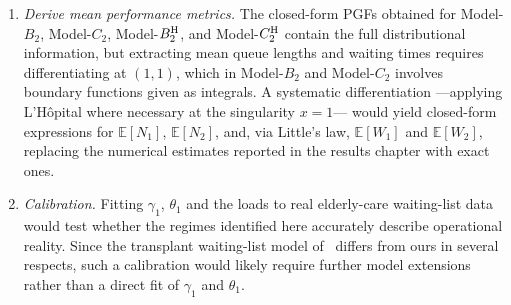 \begin{enumerate}
  \item \emph{Derive mean performance metrics.} The closed-form PGFs obtained for Model-$B_2$, Model-$C_2$, Model-$B_2^{\mathrm{H}}$, and Model-$C_2^{\mathrm{H}}$ contain the full distributional information, but extracting mean queue lengths and waiting times requires differentiating at $(1,1)$, which in Model-$B_2$ and Model-$C_2$ involves boundary functions given as integrals. A systematic differentiation ---applying L'H\^opital where necessary at the singularity $x=1$--- would yield closed-form expressions for $\mathbb{E}[N_1]$, $\mathbb{E}[N_2]$, and, via Little's law, $\mathbb{E}[W_1]$ and $\mathbb{E}[W_2]$, replacing the numerical estimates reported in the results chapter with exact ones.
  \item \emph{Calibration.} Fitting $\gamma_1$, $\theta_1$ and the loads to real elderly-care waiting-list data~\cite{zenios1999modeling} would test whether the regimes identified here accurately describe operational reality. Since the transplant waiting-list model of~\cite{zenios1999modeling} differs from ours in several respects, such a calibration would likely require further model extensions rather than a direct fit of $\gamma_1$ and $\theta_1$.
\end{enumerate}
